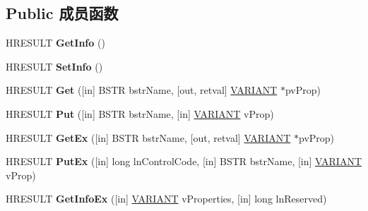 \subsection*{Public 成员函数}
\begin{DoxyCompactItemize}
\item 
\mbox{\label{interface_i_a_ds_a46eb3f9c495a01f4f70fa5c35ec49400}} 
H\+R\+E\+S\+U\+LT {\bfseries Get\+Info} ()
\item 
\mbox{\label{interface_i_a_ds_adb9333a40acdb8afd4ee97933b5b8dfb}} 
H\+R\+E\+S\+U\+LT {\bfseries Set\+Info} ()
\item 
\mbox{\label{interface_i_a_ds_aacaac9e8833580977a60cd436164b6e7}} 
H\+R\+E\+S\+U\+LT {\bfseries Get} (\mbox{[}in\mbox{]} B\+S\+TR bstr\+Name, \mbox{[}out, retval\mbox{]} \hyperlink{structtag_v_a_r_i_a_n_t}{V\+A\+R\+I\+A\+NT} $\ast$pv\+Prop)
\item 
\mbox{\label{interface_i_a_ds_aff59b4e912c018d46b77feeef1566804}} 
H\+R\+E\+S\+U\+LT {\bfseries Put} (\mbox{[}in\mbox{]} B\+S\+TR bstr\+Name, \mbox{[}in\mbox{]} \hyperlink{structtag_v_a_r_i_a_n_t}{V\+A\+R\+I\+A\+NT} v\+Prop)
\item 
\mbox{\label{interface_i_a_ds_a146caa43ba76229c80f65c081240ea9c}} 
H\+R\+E\+S\+U\+LT {\bfseries Get\+Ex} (\mbox{[}in\mbox{]} B\+S\+TR bstr\+Name, \mbox{[}out, retval\mbox{]} \hyperlink{structtag_v_a_r_i_a_n_t}{V\+A\+R\+I\+A\+NT} $\ast$pv\+Prop)
\item 
\mbox{\label{interface_i_a_ds_a2c16cb6fc3a11f0f2c368f928ad3b4db}} 
H\+R\+E\+S\+U\+LT {\bfseries Put\+Ex} (\mbox{[}in\mbox{]} long ln\+Control\+Code, \mbox{[}in\mbox{]} B\+S\+TR bstr\+Name, \mbox{[}in\mbox{]} \hyperlink{structtag_v_a_r_i_a_n_t}{V\+A\+R\+I\+A\+NT} v\+Prop)
\item 
\mbox{\label{interface_i_a_ds_aac4dcb08299c28221e2f84c7fdc57b94}} 
H\+R\+E\+S\+U\+LT {\bfseries Get\+Info\+Ex} (\mbox{[}in\mbox{]} \hyperlink{structtag_v_a_r_i_a_n_t}{V\+A\+R\+I\+A\+NT} v\+Properties, \mbox{[}in\mbox{]} long ln\+Reserved)
\end{DoxyCompactItemize}
